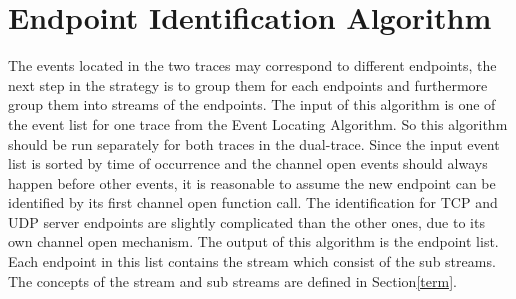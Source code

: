 \section{Endpoint Identification Algorithm}
The events located in the two traces may correspond to different endpoints, the next step in the strategy is to group them for each endpoints and furthermore group them into streams of the endpoints. The input of this algorithm is one of the event list for one trace from the Event Locating Algorithm. So this algorithm should be run separately for both traces in the dual-trace. Since the input event list is sorted by time of occurrence and the channel open events should always happen before other events, it is reasonable to assume the new endpoint can be identified by its first channel open function call. The identification for TCP and UDP server endpoints are slightly complicated than the other ones, due to its own channel open mechanism. The output of this algorithm is the endpoint list. Each endpoint in this list contains the stream which consist of the sub streams. The concepts of the stream and sub streams are defined in Section\ref{term}. 

